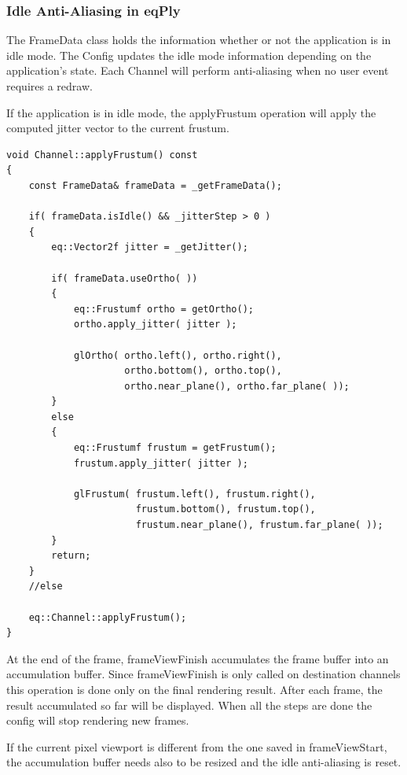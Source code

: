 \documentclass[10pt,a4]{scrartcl}
\begin{document}
\subsubsection{Idle Anti-Aliasing in eqPly}

The \textsf{FrameData} class holds the information whether or not the
application is in idle mode. The \textsf{Config} updates the idle mode
information depending on the application's state.  Each \textsf{Channel} will
perform anti-aliasing when no user event requires a redraw.

If the application is in idle mode, the \textsf{applyFrustum} operation will 
apply the computed jitter vector to the current frustum.

{\footnotesize\begin{lstlisting}
void Channel::applyFrustum() const
{
    const FrameData& frameData = _getFrameData();

    if( frameData.isIdle() && _jitterStep > 0 )
    {
        eq::Vector2f jitter = _getJitter();

        if( frameData.useOrtho( ))
        {
            eq::Frustumf ortho = getOrtho();
            ortho.apply_jitter( jitter );

            glOrtho( ortho.left(), ortho.right(),
                     ortho.bottom(), ortho.top(),
                     ortho.near_plane(), ortho.far_plane( ));
        }
        else
        {
            eq::Frustumf frustum = getFrustum();
            frustum.apply_jitter( jitter );

            glFrustum( frustum.left(), frustum.right(),
                       frustum.bottom(), frustum.top(),
                       frustum.near_plane(), frustum.far_plane( ));
        }
        return;
    }
    //else
    
    eq::Channel::applyFrustum();
}
\end{lstlisting}}

At the end of the frame, \textsf{frameViewFinish} accumulates the frame buffer
into an accumulation buffer. Since \textsf{frameViewFinish} is only called on
destination channels this operation is done only on the final rendering
result. After each frame, the result accumulated so far will be displayed. When
all the steps are done the config will stop rendering new frames.

If the current pixel viewport is different from the one saved in
\textsf{frameViewStart}, the accumulation buffer needs also to be resized and
the idle anti-aliasing is reset.
\end{document}
